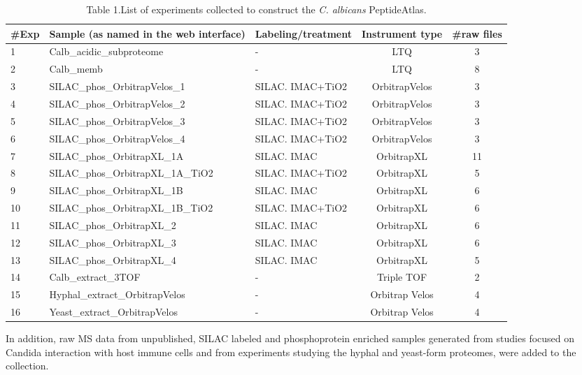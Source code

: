 \begin{table}[t]
\renewcommand{\arraystretch}{1.5}
\footnotesize
\centering
\begin{tabular}{l p{4cm} p{2cm} c c }
\hline
\#Exp & Sample \newline{} (as named in the web interface) & Labeling/treatment & Instrument type & \#raw files\\
\hline
1 & Calb\_acidic\_subproteome & - & LTQ & 3\\
2 & Calb\_memb & - & LTQ & 8\\
3 & SILAC\_phos\_OrbitrapVelos\_1 & SILAC. IMAC+TiO2 & OrbitrapVelos & 3\\
4 & SILAC\_phos\_OrbitrapVelos\_2 & SILAC. IMAC+TiO2 & OrbitrapVelos & 3\\
5 & SILAC\_phos\_OrbitrapVelos\_3 & SILAC. IMAC+TiO2 & OrbitrapVelos & 3\\
6 & SILAC\_phos\_OrbitrapVelos\_4 & SILAC. IMAC+TiO2 & OrbitrapVelos & 3\\
7 & SILAC\_phos\_OrbitrapXL\_1A & SILAC. IMAC & OrbitrapXL & 11\\
8 & SILAC\_phos\_OrbitrapXL\_1A\_TiO2 & SILAC. IMAC+TiO2 & OrbitrapXL & 5\\
9 & SILAC\_phos\_OrbitrapXL\_1B & SILAC. IMAC & OrbitrapXL & 6\\
10 & SILAC\_phos\_OrbitrapXL\_1B\_TiO2 & SILAC. IMAC+TiO2 & OrbitrapXL & 6\\
11 & SILAC\_phos\_OrbitrapXL\_2 & SILAC. IMAC & OrbitrapXL & 6\\
12 & SILAC\_phos\_OrbitrapXL\_3 & SILAC. IMAC & OrbitrapXL & 6\\
13 & SILAC\_phos\_OrbitrapXL\_4 & SILAC. IMAC & OrbitrapXL & 5\\
14 & Calb\_extract\_3TOF & - & Triple TOF & 2\\
15 & Hyphal\_extract\_OrbitrapVelos & - & Orbitrap Velos & 4\\
16 & Yeast\_extract\_OrbitrapVelos & - & Orbitrap Velos & 4\\
\end{tabular}
\caption*{Table 1.List of experiments collected to construct the \textit{C. albicans} PeptideAtlas.}
\end{table}


 

In addition, raw MS data from unpublished, SILAC labeled
and phosphoprotein enriched samples generated from studies
focused on Candida interaction with host immune cells and from
experiments studying the hyphal and yeast-form proteomes,
were added to the collection.




